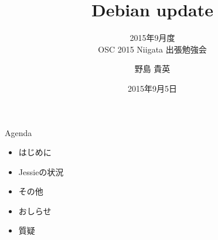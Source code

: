 \title{Debian update}
\subtitle{2015年9月度\\OSC 2015 Niigata 出張勉強会}
\author{野島 貴英 }
\date{2015年9月5日}



\begin{frame}
\titlepage{}
\end{frame}

\begin{frame}{Agenda}
  \begin{itemize}
   \item はじめに
   \item Jessieの状況
   \item その他
   \item おしらせ
   \item 質疑
  \end{itemize}
\end{frame}

%
%

